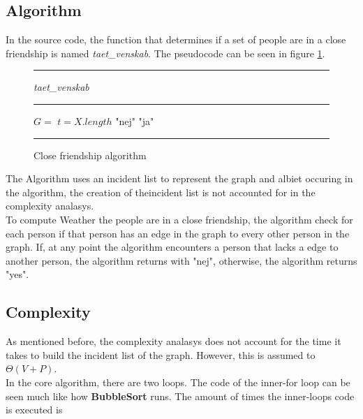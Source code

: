 \subsection{Algorithm}

In the source code, the function that determines if a set of
people are in a close friendship is named \textit{taet\_venskab}.
The pseudocode can be seen in figure \ref{fig:cla}.\\

\begin{figure}[ht]
\hrule
\vspace{0.2cm}
{\centering  \textit{taet\_venskab}}
\vspace{0.2cm}
\hrule
\begin{algorithmic}
\State $G = $ 
\State $t = X.length$
			\State \Return "nej"
		\EndIf
	\EndFor
\EndFor
\State \Return "ja"
\EndFunction
\end{algorithmic}
\hrule
\caption{Close friendship algorithm \label{fig:cla}}
\end{figure}


The Algorithm uses an incident list to represent the graph and albiet 
occuring in the algorithm, the creation of theincident list is not 
accounted for in the complexity analasys.\\

To compute Weather the people are in a close friendship, the algorithm
check for each person if that person has an edge in the graph to
every other person in the graph. If, at any point the algorithm encounters
a person that lacks a edge to another person, the algorithm returns with "nej",
otherwise, the algorithm returns "yes".

\subsection{Complexity}

As mentioned before, the complexity analasys does not account for the 
time it takes to build the incident list of the graph. However, this
is assumed to $\Theta \left( V + P \right)$.\\

In the core algorithm, there are two loops. The code of the 
inner-for loop can be seen much like how \textbf{BubbleSort}
runs. The amount of times the inner-loops code is executed is

